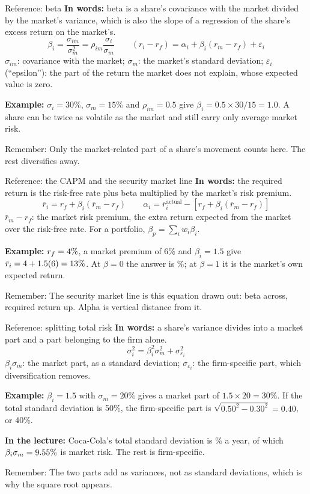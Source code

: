 \documentclass[10pt,aspectratio=169]{beamer}
\newcommand{\remember}[1]{\par\smallskip\alert{Remember:} #1}
\begin{document}
\begin{frame}[label=beta]{Reference: beta}
\textbf{In words:} beta is a share's covariance with the market divided by the market's variance, which is also the slope of a regression of the share's excess return on the market's.
\[
\beta_i=\frac{\sigma_{im}}{\sigma_m^2}=\rho_{im}\frac{\sigma_i}{\sigma_m}\qquad
(r_i-r_f)=\alpha_i+\beta_i(r_m-r_f)+\varepsilon_i
\]
$\sigma_{im}$: covariance with the market; $\sigma_m$: the market's standard deviation; $\varepsilon_i$ (``epsilon''): the part of the return the market does not explain, whose expected value is zero.
\par\smallskip
\textbf{Example:} $\sigma_i=30\%$, $\sigma_m=15\%$ and $\rho_{im}=0.5$ give $\beta_i=0.5\times30/15=1.0$. A share can be twice as volatile as the market and still carry only average market risk.
\remember{Only the market-related part of a share's movement counts here. The rest diversifies away.}
\end{frame}

\begin{frame}[label=capm]{Reference: the CAPM and the security market line}
\textbf{In words:} the required return is the risk-free rate plus beta multiplied by the market's risk premium.
\[
\bar{r}_i=r_f+\beta_i(\bar{r}_m-r_f)\qquad
\alpha_i=\bar{r}_i^{\text{actual}}-\left[r_f+\beta_i(\bar{r}_m-r_f)\right]
\]
$\bar{r}_m-r_f$: the market risk premium, the extra return expected from the market over the risk-free rate. For a portfolio, $\beta_p=\sum_i w_i\beta_i$.
\par\smallskip
\textbf{Example:} $r_f=4\%$, a market premium of 6\% and $\beta_i=1.5$ give $\bar{r}_i=4+1.5(6)=13\%$. At $\beta=0$ the answer is \LRiskFreePercent\%; at $\beta=1$ it is the market's own expected return.
\remember{The security market line is this equation drawn out: beta across, required return up. Alpha is vertical distance from it.}
\end{frame}

\begin{frame}[label=decomp]{Reference: splitting total risk}
\textbf{In words:} a share's variance divides into a market part and a part belonging to the firm alone.
\[
\sigma_i^2=\beta_i^2\sigma_m^2+\sigma_{\varepsilon_i}^2
\]
$\beta_i\sigma_m$: the market part, as a standard deviation; $\sigma_{\varepsilon_i}$: the firm-specific part, which diversification removes.
\par\smallskip
\textbf{Example:} $\beta_i=1.5$ with $\sigma_m=20\%$ gives a market part of $1.5\times20=30\%$. If the total standard deviation is 50\%, the firm-specific part is $\sqrt{0.50^2-0.30^2}=0.40$, or 40\%.
\par\smallskip
\textbf{In the lecture:} Coca-Cola's total standard deviation is \LSDKo\% a year, of which $\beta_i\sigma_m=9.55\%$ is market risk. The rest is firm-specific.
\remember{The two parts add as variances, not as standard deviations, which is why the square root appears.}
\end{frame}
\end{document}
